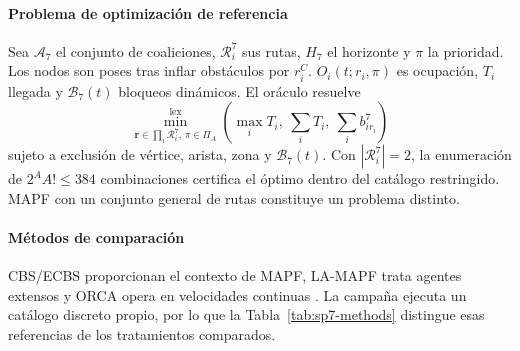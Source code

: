 \paragraph{Problema de optimización de referencia}

Sea $\mathcal A_7$ el conjunto de coaliciones, $\mathcal R_i^7$ sus rutas, $H_7$ el horizonte y $\pi$ la prioridad. Los nodos son poses tras inflar obstáculos por $r_i^C$. $O_i(t;r_i,\pi)$ es ocupación, $T_i$ llegada y $\mathcal B_7(t)$ bloqueos dinámicos. El oráculo resuelve
\begin{equation}
\label{eq:sp7-restricted-oracle}
 \min_{\boldsymbol r\in\prod_i\mathcal R_i^7,\,\pi\in\Pi_A}^{\mathrm{lex}}
 \left(\max_iT_i,\ \sum_iT_i,\ \sum_i b_{ir_i}^7\right)
\end{equation}
sujeto a exclusión de vértice, arista, zona y $\mathcal B_7(t)$. Con $|\mathcal R_i^7|=2$, la enumeración de $2^AA!\leq384$ combinaciones certifica el óptimo dentro del catálogo restringido. MAPF con un conjunto general de rutas constituye un problema distinto.

\paragraph{Métodos de comparación}

CBS/ECBS proporcionan el contexto de MAPF, LA-MAPF trata agentes extensos y ORCA opera en velocidades continuas \parencite{sharon2015cbs,barer2014ecbs,li2019largeAgentMapf,vandenberg2011orca}. La campaña ejecuta un catálogo discreto propio, por lo que la Tabla~\ref{tab:sp7-methods} distingue esas referencias de los tratamientos comparados.

